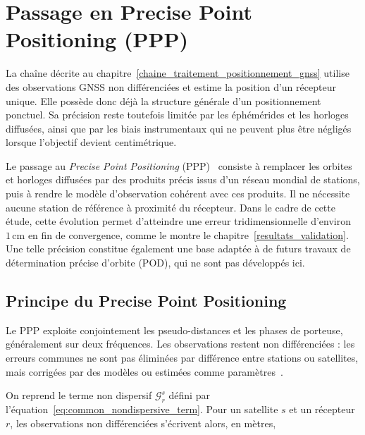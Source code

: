 
\chapter{Passage en Precise Point Positioning (PPP)}
\label{precise_point_positioning}

La chaîne décrite au chapitre~\ref{chaine_traitement_positionnement_gnss}
utilise des observations GNSS non différenciées et estime la position d'un
récepteur unique. Elle possède donc déjà la structure générale d'un
positionnement ponctuel. Sa précision reste toutefois limitée par les
éphémérides et les horloges diffusées, ainsi que par les biais instrumentaux
qui ne peuvent plus être négligés lorsque l'objectif devient centimétrique.

Le passage au \textit{Precise Point Positioning} (PPP)~\cite{zumberge1997,koubaHeroux2001} consiste à remplacer
les orbites et horloges diffusées par des produits précis issus d'un réseau
mondial de stations, puis à rendre le modèle d'observation cohérent avec ces
produits. Il ne nécessite aucune station de référence à proximité du
récepteur. Dans le cadre de cette étude, cette évolution permet d'atteindre
une erreur tridimensionnelle d'environ $1\,\mathrm{cm}$ en fin de convergence,
comme le montre le chapitre~\ref{resultats_validation}.
Une telle précision constitue également une base adaptée à de futurs travaux
de détermination précise d'orbite (POD), qui ne sont pas développés ici.

\section{Principe du Precise Point Positioning}

Le PPP exploite conjointement les pseudo-distances et les phases de porteuse,
généralement sur deux fréquences. Les observations restent non différenciées :
les erreurs communes ne sont pas éliminées par différence entre stations ou
satellites, mais corrigées par des modèles ou estimées comme paramètres~\cite{koubaHeroux2001}.

On reprend le terme non dispersif $\mathcal G_r^s$ défini par
l'équation~\eqref{eq:common_nondispersive_term}. Pour un satellite $s$ et un
récepteur $r$, les observations non différenciées s'écrivent alors, en mètres,

